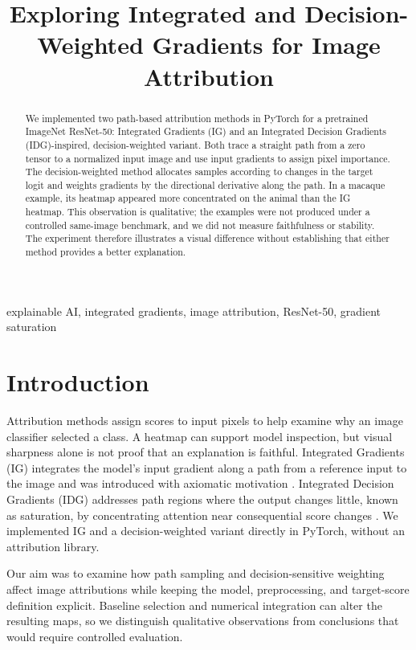 \documentclass[conference]{IEEEtran}
\begin{document}
\title{Exploring Integrated and Decision-Weighted Gradients for Image Attribution}
\author{}
\maketitle
\begin{abstract}
We implemented two path-based attribution methods in PyTorch for a pretrained ImageNet ResNet-50: Integrated Gradients (IG) and an Integrated Decision Gradients (IDG)-inspired, decision-weighted variant. Both trace a straight path from a zero tensor to a normalized input image and use input gradients to assign pixel importance. The decision-weighted method allocates samples according to changes in the target logit and weights gradients by the directional derivative along the path. In a macaque example, its heatmap appeared more concentrated on the animal than the IG heatmap. This observation is qualitative; the examples were not produced under a controlled same-image benchmark, and we did not measure faithfulness or stability. The experiment therefore illustrates a visual difference without establishing that either method provides a better explanation.
\end{abstract}
\begin{IEEEkeywords}
explainable AI, integrated gradients, image attribution, ResNet-50, gradient saturation
\end{IEEEkeywords}

\section{Introduction}
Attribution methods assign scores to input pixels to help examine why an image classifier selected a class. A heatmap can support model inspection, but visual sharpness alone is not proof that an explanation is faithful. Integrated Gradients (IG) integrates the model's input gradient along a path from a reference input to the image and was introduced with axiomatic motivation \cite{ig}. Integrated Decision Gradients (IDG) addresses path regions where the output changes little, known as saturation, by concentrating attention near consequential score changes \cite{idg}. We implemented IG and a decision-weighted variant directly in PyTorch, without an attribution library.

Our aim was to examine how path sampling and decision-sensitive weighting affect image attributions while keeping the model, preprocessing, and target-score definition explicit. Baseline selection and numerical integration can alter the resulting maps, so we distinguish qualitative observations from conclusions that would require controlled evaluation.
\end{document}
